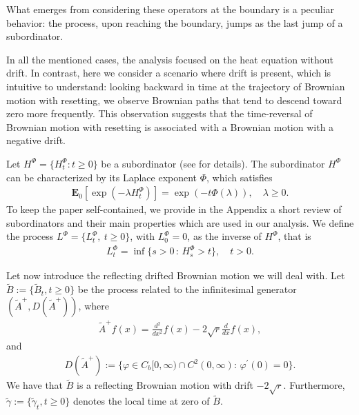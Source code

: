 \documentclass[11pt,a4paper]{article}
\theoremstyle{definition}
\theoremstyle{remark}
\begin{document}
What emerges from considering these operators at the boundary is a peculiar behavior: the process, upon reaching the boundary, jumps as the last jump of a subordinator.

In all the mentioned cases, the analysis focused on the heat equation without drift. In contrast, here we consider a scenario where drift is present, which is intuitive to understand: looking backward in time at the trajectory of Brownian motion with resetting, we observe Brownian paths that tend to descend toward zero more frequently. This observation suggests that the time-reversal of Brownian motion with resetting is associated with a Brownian motion with a negative drift.

Let \( H^\Phi = \{ H_t^\Phi : t \geq 0 \} \) be a subordinator (see \cite{bertoin1999subordinators} for details). The subordinator \( H^\Phi \) can be characterized by its Laplace exponent \(\Phi\), which satisfies
\begin{align}
	\label{LapH}
	\mathbf{E}_0[\exp(-\lambda H_t^\Phi)] = \exp(-t\Phi(\lambda)), \quad \lambda \geq 0.
\end{align}
To keep the paper self-contained, we provide in the Appendix a short review of subordinators and their main properties which are used in our analysis.
We define the process $L^\Phi=\{L_t^\Phi,\ t \geq 0\}$, with $L_0^\Phi=0$,  as the inverse of $H^\Phi$, that is
\begin{align*}
	L_t^\Phi = \inf \{s > 0\,:\, H_s^\Phi >t \}, \quad t>0.
\end{align*}

Let now introduce the reflecting drifted Brownian motion we will deal with. Let $\widetilde{B}:=\{\widetilde{B}_t, t \geq 0 \}$ be the process related to the infinitesimal generator \((\widetilde{A}^+, {D}(\widetilde{A}^+) ) \), where
\begin{align}
	\label{Atilde+}
	\widetilde{A}^+f(x)=\frac{d^2}{dx^2} f(x) -2\sqrt{r} \frac{d}{dx} f(x),
\end{align}
and
\begin{align*}
	{D}(\widetilde{A}^+):=\big\{\varphi \in C_b[0,\infty) \cap C^2(0,\infty):  \, \varphi^\prime (0)=0 \big\}.
\end{align*}
We have that $\widetilde{B}$ is a reflecting Brownian motion with drift $-2\sqrt{r}$. Furthermore, $\widetilde{\gamma}:=\{\widetilde{\gamma}_t, t \geq 0 \}$ denotes the local time at zero of $\widetilde{B}$.
\end{document}
